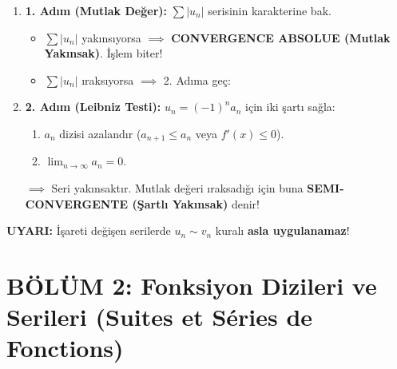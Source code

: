 \documentclass[11pt,a4paper]{article}
\begin{document}
\begin{tcolorbox}[colback=purple!5!white,colframe=purple!75!black,title=\textbf{B. İşareti Değişen / Alterne Seriler ($(-1)^n a_n$)}]
\begin{enumerate}[leftmargin=*]
    \item \textbf{1. Adım (Mutlak Değer):} $\sum |u_n|$ serisinin karakterine bak.
    \begin{itemize}
        \item $\sum |u_n|$ yakınsıyorsa $\implies$ \textbf{CONVERGENCE ABSOLUE (Mutlak Yakınsak)}. İşlem biter!
        \item $\sum |u_n|$ ıraksıyorsa $\implies$ 2. Adıma geç:
    \end{itemize}
    \item \textbf{2. Adım (Leibniz Testi):} $u_n = (-1)^n a_n$ için iki şartı sağla:
    \begin{enumerate}
        \item $a_n$ dizisi azalandır ($a_{n+1} \le a_n$ veya $f'(x) \le 0$).
        \item $\lim_{n \to \infty} a_n = 0$.
    \end{enumerate}
    $\implies$ Seri yakınsaktır. Mutlak değeri ıraksadığı için buna \textbf{SEMI-CONVERGENTE (Şartlı Yakınsak)} denir!
\end{enumerate}
\textbf{UYARI:} İşareti değişen serilerde $u_n \sim v_n$ kuralı \textbf{asla uygulanamaz}!
\end{tcolorbox}

\newpage

\section*{BÖLÜM 2: Fonksiyon Dizileri ve Serileri (Suites et Séries de Fonctions)}
\end{document}
